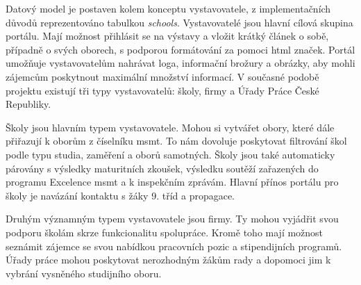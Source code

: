 Datový model \bso je postaven kolem konceptu vystavovatele, z implementačních důvodů reprezentováno tabulkou \emph{schools}. Vystavovatelé jsou hlavní cílová skupina portálu. Mají možnost přihlásit se na výstavy a vložit krátký článek o sobě, případně o svých oborech, s podporou formátování za pomoci \acrshort{html} značek. Portál umožňuje vystavovatelům nahrávat loga, informační brožury a obrázky, aby mohli zájemcům poskytnout maximální množství informací. V současné podobě projektu \bso existují tři typy vystavovatelů: školy, firmy a Úřady Práce České Republiky. 

Školy jsou hlavním typem vystavovatele. Mohou si vytvářet obory, které dále přiřazují k oborům z číselníku \acrshort{msmt}. To nám dovoluje poskytovat filtrování škol podle typu studia, zaměření a oborů samotných. Školy jsou také automaticky párovány s výsledky maturitních zkoušek, výsledku soutěží zařazených do programu Excelence \acrshort{msmt} a k inspekčním zprávám. Hlavní přínos portálu \bso pro školy je navázání kontaktu s žáky 9. tříd a propagace. 

Druhým významným typem vystavovatele jsou firmy. Ty mohou vyjádřit svou podporu školám skrze funkcionalitu spolupráce. Kromě toho mají možnost seznámit zájemce se svou nabídkou pracovních pozic a stipendijních programů. Úřady práce mohou poskytovat nerozhodným žákům rady a dopomoci jim k vybrání vysněného studijního oboru.